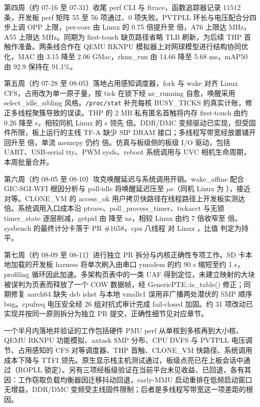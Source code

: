 第四周（约 07-16 至 07-31）收尾 perf CLI 与 ftrace，函数追踪器记录 11512 条，开发板 perf 矩阵 55 至 56 项通过、0 项失败。PVTPLL 环长与电压配合分四步上调 OPP 上限，per-core 由 Linux 的 0.75 倍提升至 \nPerCoreRatio{} 倍，A76 上限达 \nDvfsAseven MHz，A55 上限达 \nDvfsAfive MHz。同期为 first-touch 缺页路径省略 TLB 刷新，为后续 THP 首触作准备。两条线合作在 QEMU RKNPU 模拟器上对网球模型进行结构协同优化，MAC 由 3.15 降至 2.06 GMac，rknn\_run 由 14.66 降至 5.68 ms，mAP50 由 92.9 保持在 91.1\%。

第五周（约 07-28 至 08-05）落地占用感知调度器，fork 与 wake 对齐 Linux CFS，占用改为单一原子量，按 tick 在锁下经 nr\_running 自愈，唤醒采用 select\_idle\_sibling 风格。\texttt{/proc/stat} 补充每核 BUSY\_TICKS 的真实计账，修正多线程聚簇导致的误读。THP 的 2 MB 私有匿名首触将内存 first-touch 由约 0.26 降至 \nThpFT s，相较同机 Linux 的 \nThpFTLin s 领先 \nThpRatio 倍。DDR/DMC 变频驱动已实现，但受固件所限，板上运行的主线 TF-A 缺少 SIP DRAM 接口；多线程写带宽经放置铺开回升至 \nMemBWWriteRatio 倍，单流 memcpy 仍约 \nMemBWMemcpyRatio 倍。仿真与板级侧的板级 I/O 驱动，包括 UART、USB-serial tty、PWM sysfs、reboot 系统调用与 UVC 相机生命周期，本周批量合并。

第六周（约 08-05 至 08-10）攻克唤醒延迟与系统调用开销。wake\_affine 配合 GIC-SGI-WFI 根因分析与 poll-idle 将唤醒延迟压至 \nWake $\mu$s（同机 Linux 为 \nWakeLin），接近对等。CLONE\_VM 的 access\_ok 用户拷贝快路径在线程路径上开发板实测达 \nHackT 倍。系统调用入口成本沿 ptrace、poll\_process\_timer、tickacct 与无锁 timer\_state 逐层削减，getpid 由 \nGetpidBefore{} 降至 \nGetpid ns，相较 Linux 由约 7 倍收窄至 \nGetpidRatio 倍。sysbench 的最终计分卡落于 PR \#1658，cpu 八线程 \nCpuTEight 对 Linux \nCpuTEightLin，比值 \nCpuTEightRatio 判定为持平。

第七周（约 08-09 至 08-11）进行独立 PR 拆分与内核正确性专项工作。SD 卡本地加载的开发板 harness 将单次刷入由串口 ymodem 的约 90 s 缩短至约 1 s，profiling 循环因此加速。多架构页表中的一类 UAF 得到定位，未建立映射的大块被误判为页表而释放了一个 COW 数据帧，经 GenericPTE::is\_table() 修正；同期修复 aarch64 缺失 dsb ishst 与本地 vmalle1 误用非广播两处潜伏的 SMP 顺序 bug。cpufreq 电压安全经 26 组对抗式审计完成 fail-closed 加固。约 31 项改动已实现并按同一原则拆分为独立 PR 提交，正确性细节见对应章节。

一个半月内落地并验证的工作包括硬件 PMU perf 从单核到多核再到大小核、QEMU RKNPU 功能模拟、axtask SMP 分布、CPU DVFS 与 PVTPLL 电压调节、占用感知的 CFS 对等调度器、THP 首触、CLONE\_VM 快路径、系统调用成本下降与 TTFI 领先。原生显示栈主机测试通过，板级点亮已在上板会话中通过（ROPLL 锁定）。另有三项经板级验证在当前平台未见收益、已回退，各有其因：工作窃取负载均衡器因迁移抖动回退，early-MMU 启动重排在低频启动窗口无增益，DDR/DMC 变频受主线固件限制；后者是多线程写带宽这一项差距的根因。
